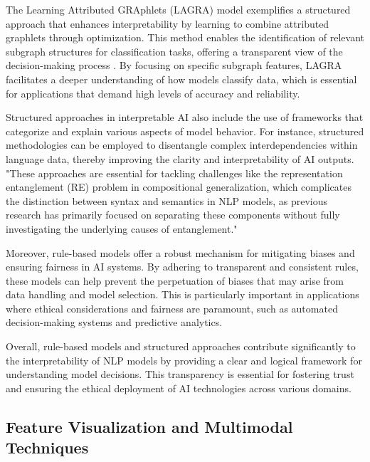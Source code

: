 The Learning Attributed GRAphlets (LAGRA) model exemplifies a structured approach that enhances interpretability by learning to combine attributed graphlets through optimization. This method enables the identification of relevant subgraph structures for classification tasks, offering a transparent view of the decision-making process \cite{shinji2024learningattributedgraphletspredictive}. By focusing on specific subgraph features, LAGRA facilitates a deeper understanding of how models classify data, which is essential for applications that demand high levels of accuracy and reliability.



Structured approaches in interpretable AI also include the use of frameworks that categorize and explain various aspects of model behavior. For instance, structured methodologies can be employed to disentangle complex interdependencies within language data, thereby improving the clarity and interpretability of AI outputs. "These approaches are essential for tackling challenges like the representation entanglement (RE) problem in compositional generalization, which complicates the distinction between syntax and semantics in NLP models, as previous research has primarily focused on separating these components without fully investigating the underlying causes of entanglement." \cite{yamshchikov2020styletransferparaphraselookingsensible,zheng2023layerwiserepresentationfusioncompositional}



Moreover, rule-based models offer a robust mechanism for mitigating biases and ensuring fairness in AI systems. By adhering to transparent and consistent rules, these models can help prevent the perpetuation of biases that may arise from data handling and model selection. This is particularly important in applications where ethical considerations and fairness are paramount, such as automated decision-making systems and predictive analytics.



Overall, rule-based models and structured approaches contribute significantly to the interpretability of NLP models by providing a clear and logical framework for understanding model decisions. This transparency is essential for fostering trust and ensuring the ethical deployment of AI technologies across various domains.



\subsection{Feature Visualization and Multimodal Techniques} \label{subsec:Feature Visualization and Multimodal Techniques}




